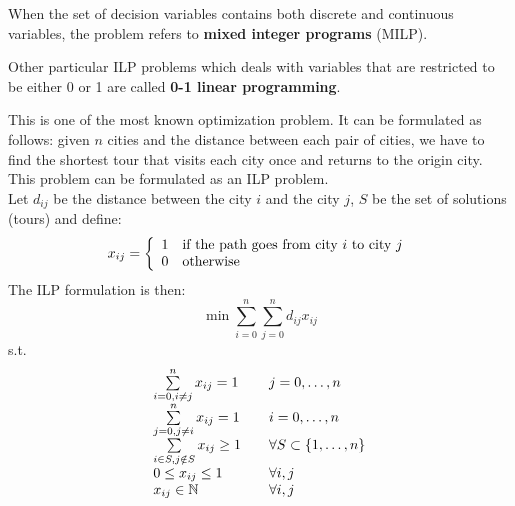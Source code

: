 When the set of decision variables contains both discrete and continuous variables, the problem refers to \textbf{mixed integer programs} (MILP).

Other particular ILP problems which deals with variables that are restricted to be either 0 or 1 are called \textbf{0-1 linear programming}.

\begin{example}
This is one of the most known optimization problem. It can be formulated as follows: given $n$ cities and the distance between each pair of cities, we have to find the shortest tour that visits each city once and returns to the origin city. This problem can be formulated as an ILP problem.\\
Let $d_{ij}$ be the distance between the city $i$ and the city $j$, $S$ be the set of solutions (tours) and define:
\begin{equation*}
x_{ij} = \left\{
	\begin{array}{l l}
	1 & \text{if the path goes from city $i$ to city $j$}\\
	0 & \text{otherwise}
	\end{array}
\right.
\end{equation*}
The ILP formulation is then:
\begin{equation}
\min \sum\limits_{i=0}^{n} \sum\limits_{j=0}^{n} d_{ij} x_{ij}
\end{equation}
s.t.
\begin{equation*}
\begin{array}{l l}
\sum\limits_{i=0, i \neq j}^{n} x_{ij} = 1 & \quad j = 0, \dots, n\\
\sum\limits_{j=0, j \neq i}^{n} x_{ij} = 1 & \quad i = 0, \dots, n\\
\sum\limits_{i \in S, j \notin S} x_{ij} \geq 1 & \quad \forall S \subset \{1, \dots, n\}\\
0 \leq x_{ij} \leq 1 & \quad \forall i,j\\
x_{ij} \in \mathbb{N} & \quad \forall i,j
\end{array}
\end{equation*}

\end{example}

